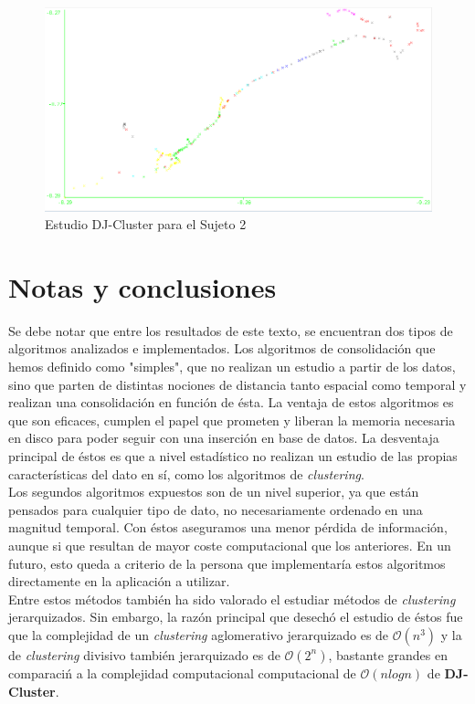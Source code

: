 \documentclass[a4paper, 12pt]{article}
\begin{document}
\begin{figure}[H]
	\includegraphics[scale=.5]{../comparativa/djClusterSujeto2.png}
	\caption{Estudio DJ-Cluster para el Sujeto 2}
\end{figure}

\pagebreak
\section{Notas y conclusiones}

Se debe notar que entre los resultados de este texto, se encuentran dos tipos de algoritmos analizados e implementados. Los algoritmos de consolidaci\'on que hemos definido como "simples", que no realizan un estudio a partir de los datos, sino que parten de distintas nociones de distancia tanto espacial como temporal y realizan una consolidaci\'on en funci\'on de \'esta. La ventaja de estos algoritmos es que son eficaces, cumplen el papel que prometen y liberan la memoria necesaria en disco para poder seguir con una inserci\'on en base de datos. La desventaja principal de \'estos es que a nivel estad\'istico no realizan un estudio de las propias caracter\'isticas del dato en s\'i, como los algoritmos de \textit{clustering}.\\

Los segundos algoritmos expuestos son de un nivel superior, ya que est\'an pensados para cualquier tipo de dato, no necesariamente ordenado en una magnitud temporal. Con \'estos aseguramos una menor p\'erdida de informaci\'on, aunque si que resultan de mayor coste computacional que los anteriores. En un futuro, esto queda a criterio de la persona que implementar\'ia estos algoritmos directamente en la aplicaci\'on a utilizar. \\

Entre estos m\'etodos tambi\'en ha sido valorado el estudiar m\'etodos de \textit{clustering} jerarquizados. Sin embargo, la raz\'on principal que desech\'o el estudio de \'estos fue que la complejidad de un \textit{clustering} aglomerativo jerarquizado es de $\mathcal{O}(n^3)$ y la de \textit{clustering} divisivo tambi\'en jerarquizado es de $\mathcal{O}(2^n)$, bastante grandes en comparaci\'n a la complejidad computacional computacional de $\mathcal{O}(n log n)$ de \textbf{DJ-Cluster}.\\
\end{document}

